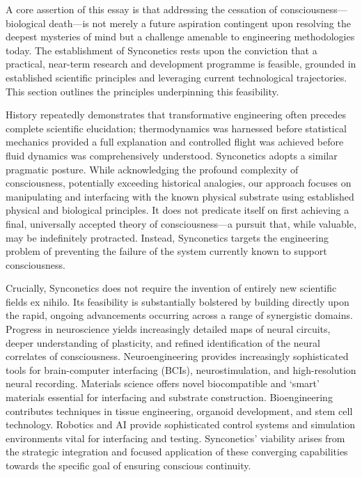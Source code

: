\documentclass[10pt]{article}
\begin{document}
\begin{sloppypar}
  A core assertion of this essay is that addressing the cessation of consciousness—biological death—is not merely a future aspiration contingent upon resolving the deepest mysteries of mind but a challenge amenable to engineering methodologies today. The establishment of Synconetics rests upon the conviction that a practical, near-term research and development programme is feasible, grounded in established scientific principles and leveraging current technological trajectories. This section outlines the principles underpinning this feasibility.

  History repeatedly demonstrates that transformative engineering often precedes complete scientific elucidation; thermodynamics was harnessed before statistical mechanics provided a full explanation and controlled flight was achieved before fluid dynamics was comprehensively understood. Synconetics adopts a similar pragmatic posture. While acknowledging the profound complexity of consciousness, potentially exceeding historical analogies, our approach focuses on manipulating and interfacing with the known physical substrate using established physical and biological principles. It does not predicate itself on first achieving a final, universally accepted theory of consciousness—a pursuit that, while valuable, may be indefinitely protracted. Instead, Synconetics targets the engineering problem of preventing the failure of the system currently known to support consciousness.

  Crucially, Synconetics does not require the invention of entirely new scientific fields ex nihilo. Its feasibility is substantially bolstered by building directly upon the rapid, ongoing advancements occurring across a range of synergistic domains. Progress in neuroscience yields increasingly detailed maps of neural circuits, deeper understanding of plasticity, and refined identification of the neural correlates of consciousness. Neuroengineering provides increasingly sophisticated tools for brain-computer interfacing (BCIs), neurostimulation, and high-resolution neural recording. Materials science offers novel biocompatible and ‘smart’ materials essential for interfacing and substrate construction. Bioengineering contributes techniques in tissue engineering, organoid development, and stem cell technology. Robotics and AI provide sophisticated control systems and simulation environments vital for interfacing and testing. Synconetics’ viability arises from the strategic integration and focused application of these converging capabilities towards the specific goal of ensuring conscious continuity.


\end{sloppypar}
\end{document}
